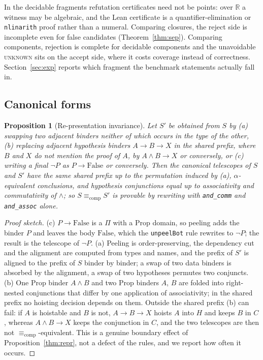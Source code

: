 \documentclass[10pt]{article}
\newtheorem{proposition}[theorem]{Proposition}
\theoremstyle{definition}
\newcommand{\Ecomp}{\mathrel{\equiv_{\mathrm{comp}}}}
\newcommand{\V}[1]{\textsc{#1}}
\begin{document}
In the decidable fragments refutation certificates need not be points: over $\mathbb R$ a
witness may be algebraic, and the Lean certificate is a quantifier-elimination or
\texttt{nlinarith} proof rather than a numeral. Comparing closures, the reject side is
incomplete even for false candidates (Theorem~\ref{thm:sep}). Comparing components,
rejection is complete for decidable components and the unavoidable \V{unknown} sits on the
accept side, where it costs coverage instead of correctness. Section~\ref{sec:exp} reports
which fragment the benchmark statements actually fall in.

\subsection{Canonical forms}

\begin{proposition}[Re-presentation invariance]\label{prop:canon}
Let $S'$ be obtained from $S$ by (a) swapping two adjacent binders neither of which occurs in
the type of the other, (b) replacing adjacent hypothesis binders $A\to B\to X$ in the shared
prefix, where $B$ and $X$ do not mention the proof of $A$, by $A\wedge B\to X$ or conversely, or (c) writing a final $\neg P$ as $P\to\mathrm{False}$
or conversely. Then the canonical telescopes of $S$ and $S'$ have the same shared prefix up
to the permutation induced by (a), $\alpha$-equivalent conclusions, and hypothesis conjunctions
equal up to associativity and commutativity of $\wedge$; so $S\Ecomp S'$ is provable by
rewriting with \texttt{and\_comm} and \texttt{and\_assoc} alone.
\end{proposition}

\begin{proof}[Proof sketch]
(c) $P\to\mathrm{False}$ is a $\Pi$ with a Prop domain, so peeling adds the binder $P$ and
leaves the body $\mathrm{False}$, which the \texttt{unpeelBot} rule rewrites to $\neg P$;
the result is the telescope of $\neg P$. (a) Peeling is order-preserving, the dependency cut
and the alignment are computed from types and names, and the prefix of $S'$ is aligned to the
prefix of $S$ binder by binder; a swap of two data binders is absorbed by the alignment, a
swap of two hypotheses permutes two conjuncts. (b) One Prop binder $A\wedge B$ and two Prop
binders $A$, $B$ are folded into right-nested conjunctions that differ by one application of
associativity; in the shared prefix no hoisting decision depends on them. Outside the shared
prefix (b) can fail: if $A$ is hoistable and $B$ is not, $A\to B\to X$ hoists $A$ into $H$ and
keeps $B$ in $C$, whereas $A\wedge B\to X$ keeps the conjunction in $C$, and the two telescopes
are then not $\Ecomp$-equivalent. This is a genuine boundary effect of
Proposition~\ref{thm:repr}, not a defect of the rules, and we report how often it occurs.
\end{proof}
\end{document}
